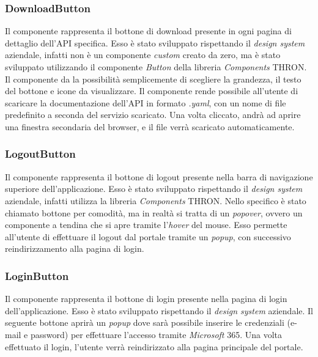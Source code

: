 \subsubsection{DownloadButton}\label{subsubsec:download-button}
Il componente rappresenta il bottone di download presente in ogni pagina di dettaglio dell'API specifica. Esso è stato sviluppato rispettando il \textit{design system}
aziendale, infatti non è un componente \textit{custom} creato da zero, ma è stato sviluppato utilizzando il componente \textit{Button} della libreria \textit{Components} THRON.
Il componente da la possibilità semplicemente di scegliere la grandezza, il testo del bottone e icone da visualizzare.
Il componente rende possibile all'utente di scaricare la documentazione dell'API in formato \textit{.yaml}, con un nome di file predefinito a seconda 
del servizio scaricato. Una volta cliccato, andrà ad aprire una finestra secondaria del browser, e il file verrà scaricato automaticamente.\\

\subsubsection{LogoutButton}\label{subsubsec:logout-button}
Il componente rappresenta il bottone di logout presente nella barra di navigazione superiore dell'applicazione.
Esso è stato sviluppato rispettando il \textit{design system} aziendale, infatti utilizza la libreria \textit{Components} THRON.
Nello specifico è stato chiamato bottone per comodità, ma in realtà si tratta di un \textit{popover}, ovvero un componente a tendina che si apre
tramite l'\textit{hover} del mouse. Esso permette all'utente di effettuare il logout dal portale tramite un \textit{popup}, con successivo reindirizzamento
alla pagina di login.


\subsubsection{LoginButton}\label{subsubsec:login-button}
Il componente rappresenta il bottone di login presente nella pagina di login dell'applicazione. Esso è stato sviluppato rispettando il \textit{design system} aziendale.
Il seguente bottone aprirà un \textit{popup} dove sarà possibile inserire le credenziali (e-mail e password) per effettuare l'accesso tramite \textit{Microsoft} 365.
Una volta effettuato il login, l'utente verrà reindirizzato alla pagina principale del portale.

